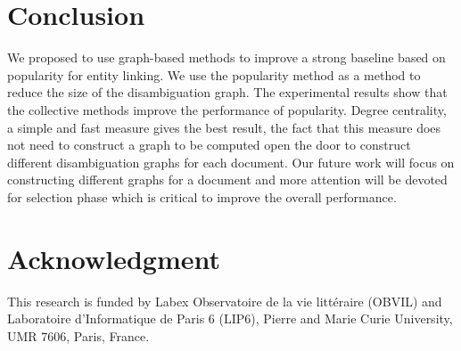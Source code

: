 \documentclass{llncs}
\begin{document}

\section{Conclusion}
We proposed to use  graph-based methods to improve a strong baseline based on popularity for entity linking. We  use the popularity method  as a method to reduce the size of the disambiguation graph.  The experimental results show that the collective methods improve the performance of popularity. Degree centrality, a simple and fast measure gives the best result, the fact that this measure does not need to construct a graph to be computed open the door to construct different disambiguation graphs for each document. Our future work  will focus on constructing different graphs for a document and  more attention will be devoted for selection phase which is critical  to improve the overall performance.
\section{Acknowledgment}
This research is funded by Labex Observatoire de la vie littéraire (OBVIL) and Laboratoire d'Informatique de Paris 6 (LIP6), Pierre and Marie Curie University, UMR 7606, Paris, France.


\end{document}
